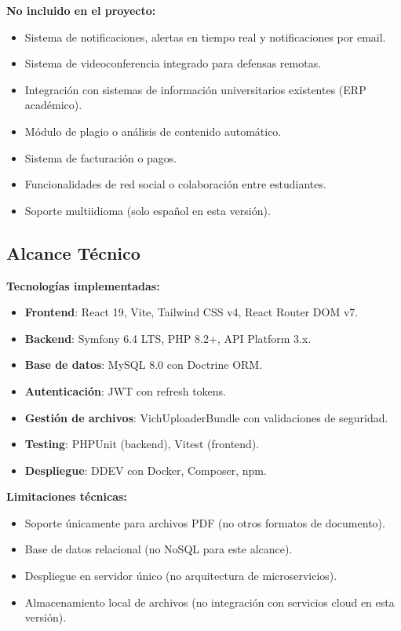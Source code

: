 \documentclass[12pt,a4paper,oneside]{report}
\providecommand{\tightlist}{%
  \setlength{\itemsep}{0pt}\setlength{\parskip}{0pt}}
\begin{document}
\textbf{No incluido en el proyecto:}

\begin{itemize}
\tightlist
\item
  Sistema de notificaciones, alertas en tiempo real y
  notificaciones por email.
\item
  Sistema de videoconferencia integrado para defensas remotas.
\item
  Integración con sistemas de información universitarios existentes (ERP
  académico).
\item
  Módulo de plagio o análisis de contenido automático.
\item
  Sistema de facturación o pagos.
\item
  Funcionalidades de red social o colaboración entre estudiantes.
\item
  Soporte multiidioma (solo español en esta versión).
\end{itemize}

\subsection{Alcance Técnico}\label{alcance-tuxe9cnico}

\textbf{Tecnologías implementadas:}

\begin{itemize}
\tightlist
\item
  \textbf{Frontend}: React 19, Vite, Tailwind CSS v4, React Router DOM
  v7.
\item
  \textbf{Backend}: Symfony 6.4 LTS, PHP 8.2+, API Platform 3.x.
\item
  \textbf{Base de datos}: MySQL 8.0 con Doctrine ORM.
\item
  \textbf{Autenticación}: JWT con refresh tokens.
\item
  \textbf{Gestión de archivos}: VichUploaderBundle con validaciones de
  seguridad.
\item
  \textbf{Testing}: PHPUnit (backend), Vitest (frontend).
\item
  \textbf{Despliegue}: DDEV con Docker, Composer, npm.
\end{itemize}

\textbf{Limitaciones técnicas:}

\begin{itemize}
\tightlist
\item
  Soporte únicamente para archivos PDF (no otros formatos de documento).
\item
  Base de datos relacional (no NoSQL para este alcance).
\item
  Despliegue en servidor único (no arquitectura de microservicios).
\item
  Almacenamiento local de archivos (no integración con servicios cloud
  en esta versión).
\end{itemize}
\end{document}
